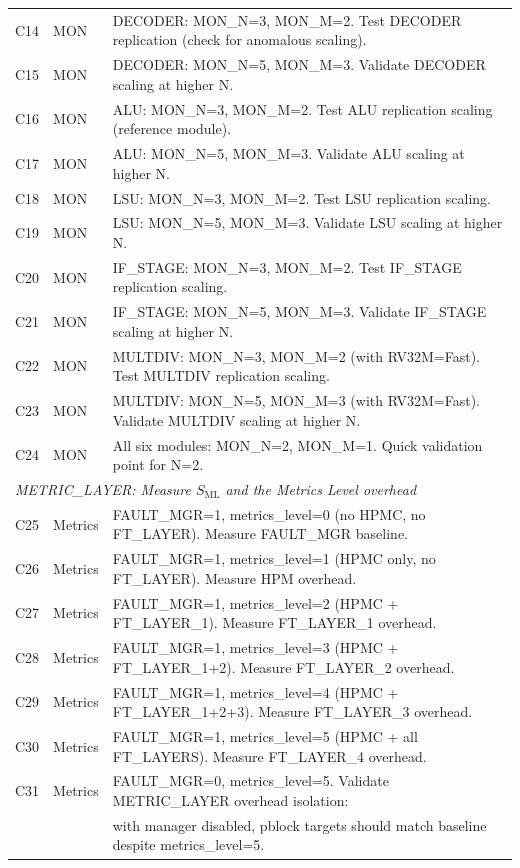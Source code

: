 \begin{table}[htbp]
\begin{tabularx}{\linewidth}{@{}llX@{}}
C14 & MON & DECODER: MON\_N=3, MON\_M=2. Test DECODER replication (check for anomalous scaling). \\
C15 & MON & DECODER: MON\_N=5, MON\_M=3. Validate DECODER scaling at higher N. \\
C16 & MON & ALU: MON\_N=3, MON\_M=2. Test ALU replication scaling (reference module). \\
C17 & MON & ALU: MON\_N=5, MON\_M=3. Validate ALU scaling at higher N. \\
C18 & MON & LSU: MON\_N=3, MON\_M=2. Test LSU replication scaling. \\
C19 & MON & LSU: MON\_N=5, MON\_M=3. Validate LSU scaling at higher N. \\
C20 & MON & IF\_STAGE: MON\_N=3, MON\_M=2. Test IF\_STAGE replication scaling. \\
C21 & MON & IF\_STAGE: MON\_N=5, MON\_M=3. Validate IF\_STAGE scaling at higher N. \\
C22 & MON & MULTDIV: MON\_N=3, MON\_M=2 (with RV32M=Fast). Test MULTDIV replication scaling. \\
C23 & MON & MULTDIV: MON\_N=5, MON\_M=3 (with RV32M=Fast). Validate MULTDIV scaling at higher N. \\
C24 & MON & All six modules: MON\_N=2, MON\_M=1. Quick validation point for N=2. \\
\midrule
\multicolumn{3}{l}{\textit{METRIC\_LAYER: Measure $S_{\text{ML}}$ and the Metrics Level overhead}} \\
C25 & Metrics & FAULT\_MGR=1, metrics\_level=0 (no HPMC, no FT\_LAYER). Measure FAULT\_MGR baseline. \\
C26 & Metrics & FAULT\_MGR=1, metrics\_level=1 (HPMC only, no FT\_LAYER). Measure HPM overhead. \\
C27 & Metrics & FAULT\_MGR=1, metrics\_level=2 (HPMC + FT\_LAYER\_1). Measure FT\_LAYER\_1 overhead. \\
C28 & Metrics & FAULT\_MGR=1, metrics\_level=3 (HPMC + FT\_LAYER\_1+2). Measure FT\_LAYER\_2 overhead. \\
C29 & Metrics & FAULT\_MGR=1, metrics\_level=4 (HPMC + FT\_LAYER\_1+2+3). Measure FT\_LAYER\_3 overhead. \\
C30 & Metrics & FAULT\_MGR=1, metrics\_level=5 (HPMC + all FT\_LAYERS). Measure FT\_LAYER\_4 overhead. \\
C31 & Metrics & FAULT\_MGR=0, metrics\_level=5. Validate METRIC\_LAYER overhead isolation: \\
 & & with manager disabled, pblock targets should match baseline despite metrics\_level=5. \\

\end{tabularx}
\end{table}

